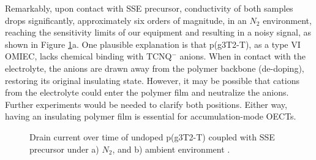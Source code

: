 Remarkably, upon contact with SSE precursor, conductivity of both samples drops significantly, approximately six orders of magnitude, in an $N_{2}$ environment, reaching the sensitivity limits of our equipment and resulting in a noisy signal, as shown in Figure \ref{fig:revox1}a. One plausible explanation is that p(g3T2-T), as a type VI OMIEC, lacks chemical binding with TCNQ$^{-}$ anions. When in contact with the electrolyte, the anions are drawn away from the polymer backbone (de-doping), restoring its original insulating state. However, it may be possible that cations from the electrolyte could enter the polymer film and neutralize the anions. Further experiments would be needed to clarify both positions. Either way, having an insulating polymer film is essential for accumulation-mode OECTs.

\begin{figure}[ht]
    \centering
    \caption[Drain current over time of undoped-p(g3T2-T) coupled with SSE precursor]{Drain current over time of undoped p(g3T2-T) coupled with SSE precursor under a) $N_{2}$, and b) ambient environment%
    .}
    \label{fig:revox1}
\end{figure}

